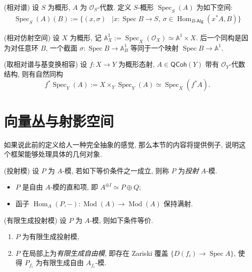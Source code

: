 \documentclass{book}
\begin{document}
	\begin{definition}
		{(相对谱)}
		设 $S$ 为概形, $A$ 为 $\mathcal O_S$-代数.	定义 $S$-概形 $\operatorname{Spec}_S(A)$ 为如下空间:
		$$
		\begin{aligned}
		\operatorname{Spec}_S(A)(B) := \{(x,\sigma)&\mid x\colon \operatorname{Spec} B\to S,\ 
		\sigma\in\operatorname{Hom}_{B\text{-}\mathsf{Alg}}( x^*A,B)
		\}
		\end{aligned}
		$$
	\end{definition}
	
	\begin{example}
		{(相对仿射空间)}
		设 $X$ 为概形, 记 $\mathbb A^1_X := \operatorname{Spec}_X(\mathcal O_X) \simeq \mathbb A^1\times X$. 后一个同构是因为对任意环 $B$, 一个截面 $\sigma\colon \operatorname{Spec} B\to \mathbb A^1_B$ 等同于一个映射 $\operatorname{Spec} B\to \mathbb A^1$.
	\end{example}
	
	\begin{prop}
		[label={relative-spectrum-base-change}]
		{(取相对谱与基变换相容)}
		设 $f\colon X\to Y$ 为概形态射, $A\in\mathsf{QCoh}(Y)$ 带有 $\mathcal O_Y$-代数结构, 则有自然同构
		$$
		f^*\operatorname{Spec}_Y(A):= X\times_Y\operatorname{Spec}_Y(A) \simeq \operatorname{Spec}_X(f^*A).
		$$
	\end{prop}
	
	\section{向量丛与射影空间}
	
	如果说此前的定义给人一种完全抽象的感觉, 那么本节的内容将提供例子, 说明这个框架能够处理具体的几何对象.
	
	\begin{propdef}
		{(投射模)}
		设 $P$ 为 $A$-模, 若如下等价条件之一成立, 则称 $P$ 为\emph{投射} $A$-模.
		\begin{itemize}
			\item $P$ 是自由 $A$-模的直和项, 即 $A^{\oplus I}\simeq P\oplus Q$;
			\item 函子 $\operatorname{Hom}_A(P,-)\colon \operatorname{Mod}(A)\to\operatorname{Mod}(A)$ 保持满射.
		\end{itemize}
	\end{propdef}
	
	\begin{prop}
		{(有限生成投射模)}
		设 $P$ 为 $A$-模, 则如下条件等价.
		\begin{enumerate}
			[(1)]
			\item $P$ 为有限生成投射模,
			\item $P$ 在局部上为\emph{有限生成自由模}, 即存在 Zariski 覆盖 $\{D(f_i)\to\operatorname{Spec} A\}$, 使得 $P_{f_i}$ 为有限生成自由 $A_{f_i}$-模.
		\end{enumerate}
	\end{prop}
	
\end{document}

